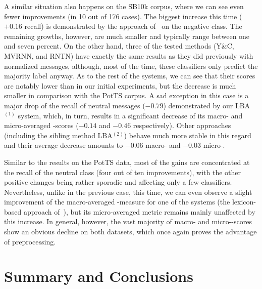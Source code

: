 A similar situation also happens on the SB10k corpus, where we can see
even fewer improvements (in 10 out of 176 cases).  The biggest
increase this time ($+0.16$ recall) is demonstrated by the approach
of~\citet{Baziotis:17} on the negative class.  The remaining growths,
however, are much smaller and typically range between one and seven
percent.  On the other hand, three of the tested methods (Y\&C, MVRNN,
and RNTN) have exactly the same results as they did previously with
normalized messages, although, most of the time, these classifiers
only predict the majority label anyway.  As to the rest of the
systems, we can see that their scores are notably lower than in our
initial experiments, but the decrease is much smaller in comparison
with the PotTS corpus.  A sad exception in this case is a major drop
of the recall of neutral messages ($-0.79$) demonstrated by our
LBA$^{(1)}$ system, which, in turn, results in a significant decrease
of its macro- and micro-averaged \F{}-scores ($-0.14$ and $-0.46$
respectively).  Other approaches (including the sibling method
LBA$^{(2)}$) behave much more stable in this regard and their average
decrease amounts to $-0.06$ macro- and $-0.03$ micro-\F{}.

Similar to the results on the PotTS data, most of the gains are
concentrated at the recall of the neutral class (four out of ten
improvements), with the other positive changes being rather sporadic
and affecting only a few classifiers.  Nevertheless, unlike in the
previous case, this time, we can even observe a slight improvement of
the macro-averaged \F-measure for one of the systems (the
lexicon-based approach of~\citeauthor{Jurek:15}), but its
micro-averaged metric remains mainly unaffected by this increase.  In
general, however, the vast majority of macro- and micro-\F-scores show
an obvious decline on both datasets, which once again proves the
advantage of preprocessing.

\section{Summary and Conclusions}\label{slsa:subsec:conclusions}

